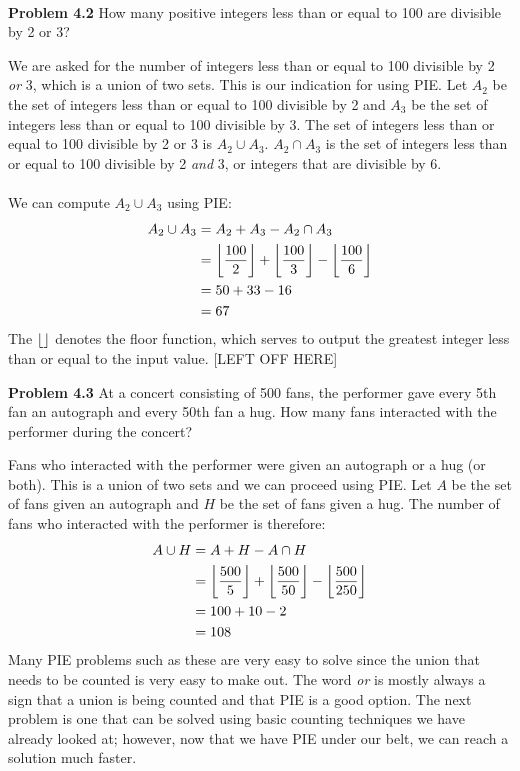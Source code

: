\documentclass[11pt]{scrartcl}
\DeclarePairedDelimiter\floor{\lfloor}{\rfloor}
\begin{document}
 \\
\begin{tcolorbox}
\textbf{Problem 4.2} How many positive integers less than or equal to 100 are divisible by 2 or 3?
\end{tcolorbox}
\noindent 
We are asked for the number of integers less than or equal to 100 divisible by 2 \textit{or} 3, which is a union of two sets. This is our indication for using PIE. Let $A_2$ be the set of integers less than or equal to 100 divisible by 2 and $A_3$ be the set of integers less than or equal to 100 divisible by 3. The set of integers less than or equal to 100 divisible by 2 or 3 is $A_2 \cup A_3$. $A_2 \cap A_3$ is the set of integers less than or equal to 100 divisible by 2 \textit{and} 3, or integers that are divisible by 6. \\
\\
\noindent 
We can compute $A_2 \cup A_3$ using PIE:
\begin{align*}
{A_2 \cup A_3} &={A_2}+{A_3}-{A_2 \cap A_3} \\
               &=  \floor*{\frac{100}{2}}+ \floor*{\frac{100}{3}}- \floor*{\frac{100}{6}} \\
               &= 50+33-16 \\
               &= 67
\end{align*}
\noindent 
The $\floor*{}$ denotes the floor function,  which serves to output the greatest integer  less than or equal to the input value. [LEFT OFF HERE]
\begin{tcolorbox}
\textbf{Problem 4.3} At a concert consisting of 500 fans, the performer gave every 5th fan an autograph and every 50th fan a hug. How many fans interacted with the performer during the concert?
\end{tcolorbox}
\noindent 
Fans who interacted with the performer were given an autograph or a hug (or both). This is a union of two sets and we can proceed using PIE. Let $A$ be the set of fans given an autograph and $H$ be the set of fans given a hug. The number of fans who interacted with the performer is therefore: 
\begin{align*}
{A \cup H} &= A + H -{A \cap H} \\
           &= \floor*{\frac{500}{5}}+\floor*{\frac{500}{50}}-\floor*{\frac{500}{250}} \\
           &= 100+10-2 \\
           &= 108
\end{align*}
\noindent 
Many PIE problems such as these are very easy to solve since the union that needs to be counted is very easy to make out. The word \textit{or} is mostly always a sign that a union is being counted and that PIE is a good option. The next problem is one that can be solved using basic counting techniques we have already looked at; however, now that we have PIE under our belt, we can reach a solution much faster. 
\end{document}
